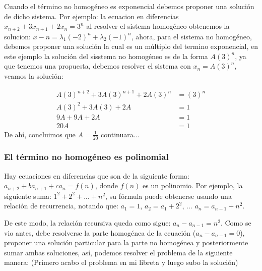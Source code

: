 \documentclass{article}
\begin{document}
Cuando el t\'ermino no homog\'eneo es exponencial debemos proponer una
soluci\'on de dicho sistema. Por ejemplo: la ecuacion en diferencias
$x_{n+2}+3x_{n+1}+2x_n=3^n$ al resolver el sistema homog\'eneo
obtenemos la solucion: $x-n=\lambda_1(-2)^n+\lambda_2(-1)^n$, ahora,
para el sistema no homog\'eneo, debemos proponer una soluci\'on la
cual es un m\'ultiplo del termino exponencial, en este ejemplo la
soluci\'on del sisstema no homog\'eneo es de la forma $A(3)^n$, ya que
tenemos una propuesta, debemos resolver el sistema con $x_n=A(3)^n$,
veamos la soluci\'on:

\begin{align*}
  \label{solucion 32}
  A(3)^{n+2}+3A(3)^{n+1}+2A(3)^n&=(3)^n\\
  A(3)^2+3A(3)+2A&=1\\
  9A+9A+2A&=1\\
  20A&=1
\end{align*}
De ahí, concluimos que $A=\frac{1}{20}$
continuara...

\subsubsection{El término no homogéneo es polinomial}
\label{sec:polinomial}

Hay ecuaciones en diferencias que son de la siguiente forma: $a_{n+2}+ba_{n+1}+ca_n=f(n)$, donde $f(n)$ es un polinomio. Por ejemplo, la siguiente suma: $1^2+2^2+...+n^2$, su fórmula puede obtenerse usando una relación de recurrencia, notando que:
$a_1=1$,
$a_2=a_1+2^2$,
...
$a_n=a_{n-1}+n^2$.


De este modo, la relación recursiva queda como sigue: $a_{n}-a_{n-1}=n^2$.
Como se vio antes, debe resolverse la parte homogénea de la ecuación ($a_n-a_{n-1}=0$), proponer una solución particular para la parte no homogénea y posteriormente sumar ambas soluciones, así, podemos resolver el problema de la siguiente manera:
(Primero acabo el problema en mi libreta y luego subo la solución)

\end{document}

